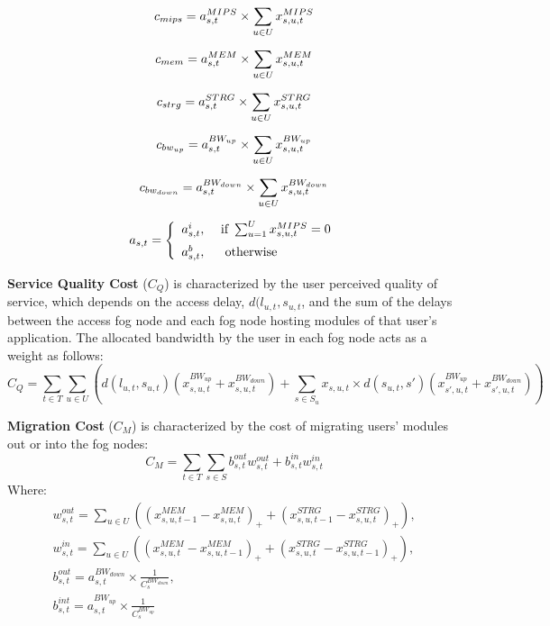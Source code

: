 \documentclass{article}
\begin{document}
\begin{gather}
    c_{mips} = a^{MIPS}_{s,t} \times \sum_{u \in U} x^{MIPS}_{s,u,t}\\[6pt]
    c_{mem} =  a^{MEM}_{s,t} \times \sum_{u \in U} x^{MEM}_{s,u,t}\\[6pt]
    c_ {strg} =  a^{STRG}_{s,t} \times \sum_{u \in U} x^{STRG}_{s,u,t}\\[6pt]
    c_{bw_{up}} = a^{BW_{up}}_{s,t} \times \sum_{u \in U} x^{BW_{up}}_{s,u,t}\\[6pt]
    c_{bw_{down}} = a^{BW_{down}}_{s,t} \times \sum_{u \in U} x^{BW_{down}}_{s,u,t}\\[6pt]
    a_{s,t} = \left\{ \begin{array}{ll} a^i_{s,t}, & \text{ if }\sum_{u=1}^Ux^{MIPS}_{s,u,t} = 0 \\[6pt]
    a^b_{s,t}, & \text{ \text{ otherwise } } \end{array} \right.
\end{gather}

\vspace{12pt}
\noindent\textbf{Service Quality Cost} ($C_Q$) is characterized by the user perceived quality of service, which depends on the access delay, $d(l_{u,t}, s_{u,t}$, and the sum of the delays between the access fog node and each fog node hosting modules of that user's application. The allocated bandwidth by the user in each fog node acts as a weight as follows:
\begin{equation}
    C_Q = \sum_{t \in T} \sum_{u \in U} \left(d(l_{u,t}, s_{u,t})(x^{BW_{up}}_{s,u,t} + x^{BW_{down}}_{s,u,t}) + \sum_{s \in S_u} x_{s,u,t} \times d(s_{u,t}, s') (x^{BW_{up}}_{s',u,t} + x^{BW_{down}}_{s',u,t})\right)
\end{equation}

\vspace{12pt}
\noindent\textbf{Migration Cost} ($C_M$) is characterized by the cost of migrating users' modules out or into the fog nodes:
\begin{equation}
    C_M = \sum_{t \in T} \sum_{s \in S} b^{out}_{s,t}w^{out}_{s,t} + b^{in}_{s,t}w^{in}_{s,t}
\end{equation}
\noindent Where:
\begin{gather}
    w^{out}_{s,t} = \sum_{u \in U} \left((x^{MEM}_{s,u,t-1} - x^{MEM}_{s,u,t})_+ + (x^{STRG}_{s,u,t-1} - x^{STRG}_{s,u,t})_+\right),\\[6pt]
    w^{in}_{s,t} = \sum_{u \in U} \left((x^{MEM}_{s,u,t} - x^{MEM}_{s,u,t-1})_+ + (x^{STRG}_{s,u,t} - x^{STRG}_{s,u,t-1})_+\right),\\[6pt]
    b^{out}_{s,t} = a^{BW_{down}}_{s,t} \times \frac{1}{C^{BW_{down}}_{s}},\\[6pt]
    b^{int}_{s,t} = a^{BW_{up}}_{s,t} \times \frac{1}{C^{BW_{up}}_{s}}
\end{gather}
\end{document}
